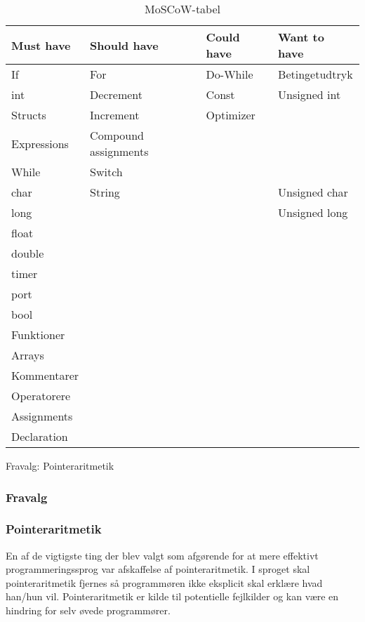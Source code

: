 \begin{table}[H]
\begin{tabular}{|m{12em}|m{11em}|m{9em}|m{7em}|}
\hline
\textbf{Must have} & \textbf{Should have} & \textbf{Could have} & \textbf{Want to have} \\ \hline
 If & For & Do-While & Betingetudtryk   \\ \hline
 int & Decrement & Const & Unsigned int  \\ \hline
 
 
 Structs & Increment & Optimizer &    \\ \hline
 Expressions & Compound assignments &  &   \\ \hline
 While & Switch &  &    \\ \hline
 
 char & String &  & Unsigned char  \\ \hline
 long &  &  & Unsigned long  \\ \hline
 float &  &  &   \\ \hline
 double &  &  &   \\ \hline
 timer &  &  &   \\ \hline
 port &  &  &   \\ \hline
 bool &  &  &   \\ \hline
 Funktioner &  &  &    \\ \hline
 Arrays &  &  &    \\ \hline
 Kommentarer &  &  &   \\ \hline
 Operatorere &  &  &   \\ \hline

 Assignments &  &  &    \\ \hline
 Declaration  &  &  &   \\ \hline
\end{tabular}
\caption{MoSCoW-tabel}
\label{tab:moscow}
\end{table}

Fravalg:
Pointeraritmetik

\subsubsection{Fravalg}

\subsubsection*{Pointeraritmetik}
En af de vigtigste ting der blev valgt som afgørende for at mere effektivt programmeringssprog var afskaffelse af pointeraritmetik. I sproget skal pointeraritmetik fjernes så programmøren ikke eksplicit skal erklære hvad han/hun vil. Pointeraritmetik er kilde til potentielle fejlkilder og kan være en hindring for selv øvede programmører.

